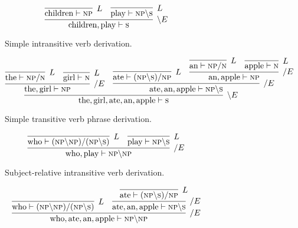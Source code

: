  \begin{figure}
     \begin{subfigure}[b]{1\textwidth}
         \centering
         \[
         \infer[\backslash E]{\text{children}, \text{play} \vdash \textsc{s}}{
             \infer[L]{\text{children} \vdash \textsc{np}}{}
             &
             \infer[L]{\text{play} \vdash \textsc{np}\backslash \textsc{s}}{}
         } 
         \]
         \caption{Simple intransitive verb derivation.}
     \end{subfigure}
     \begin{subfigure}[b]{1\textwidth}
         \centering
         \[
         \infer[\backslash E]{\text{the}, \text{girl}, \text{ate}, \text{an}, \text{apple} \vdash \textsc{s}}{
             \infer[/E]{\text{the}, \text{girl} \vdash \textsc{np}}{
                 \infer[L]{\text{the} \vdash \textsc{np} / \textsc{n}}{}
                 &
                 \infer[L]{\text{girl} \vdash \textsc{n}}{}
             }
             &
             \infer[/E]{\text{ate}, \text{an}, \text{apple} \vdash \textsc{np} \backslash \textsc{s}}{
                 \infer[L]{\text{ate} \vdash (\textsc{np} \backslash \textsc{s})/\textsc{np}}{}
                 &
                 \infer[/E]{\text{an}, \text{apple} \vdash \textsc{np}}{
                     \infer[L]{\text{an} \vdash \textsc{np}/ \textsc{n}}{}
                     &
                     \infer[L]{\text{apple} \vdash \textsc{n}}{}
                 }
             }
         }
         \]
         \caption{Simple transitive verb phrase derivation.}
     \end{subfigure}
     \begin{subfigure}[b]{1\textwidth}
     \[
     \infer[/ E]{\text{who}, \text{play} \vdash \textsc{np} \backslash \textsc{np}}{
     	\infer[L]{\text{who} \vdash (\textsc{np}\backslash \textsc{np}) / (\textsc{np} \backslash \textsc{s})}{}
     	&
     	\infer[L]{\text{play} \vdash \textsc{np} \backslash \textsc{s}}{}
     }
     \]
     \caption{Subject-relative intransitive verb derivation.}
     \end{subfigure}
     \begin{subfigure}[b]{1\textwidth}
         \centering
		\[
		\infer[/E]{\text{who}, \text{ate}, \text{an}, \text{apple} \vdash \textsc{np}\backslash \textsc{np}}{
			\infer[L]{\text{who} \vdash (\textsc{np} \backslash \textsc{np}) / (\textsc{np} \backslash \textsc{s})}{}
			&
			\infer[/E]{\text{ate}, \text{an}, \text{apple} \vdash \textsc{np}\backslash \textsc{s}}{
				\infer[L]{\text{ate} \vdash (\textsc{np}\backslash \textsc{s})/\textsc{np}}{}
}}\]
\end{subfigure}
\end{figure}
